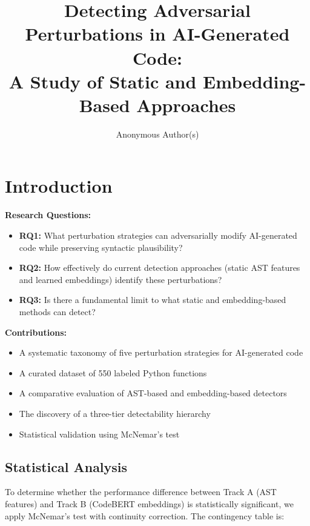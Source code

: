 \documentclass[11pt]{article}
\title{Detecting Adversarial Perturbations in AI-Generated Code:\\A Study of Static and Embedding-Based Approaches}
\author{Anonymous Author(s)}
\date{}
\begin{document}
\maketitle

\begin{abstract}
\end{abstract}

\section{Introduction}
\label{sec:intro}

\textbf{Research Questions:}
\begin{itemize}[itemsep=0pt, topsep=0pt]
    \item \textbf{RQ1:} What perturbation strategies can adversarially modify AI-generated code while preserving syntactic plausibility?
    \item \textbf{RQ2:} How effectively do current detection approaches (static AST features and learned embeddings) identify these perturbations?
    \item \textbf{RQ3:} Is there a fundamental limit to what static and embedding-based methods can detect?
\end{itemize}

\textbf{Contributions:}
\begin{itemize}[itemsep=0pt, topsep=0pt]
    \item A systematic taxonomy of five perturbation strategies for AI-generated code
    \item A curated dataset of 550 labeled Python functions
    \item A comparative evaluation of AST-based and embedding-based detectors
    \item The discovery of a three-tier detectability hierarchy
    \item Statistical validation using McNemar's test
\end{itemize}


\subsection{Statistical Analysis}
\label{sec:statistical}

To determine whether the performance difference between Track A (AST features) and Track B (CodeBERT embeddings) is statistically significant, we apply McNemar's test with continuity correction. The contingency table is:
\end{document}
